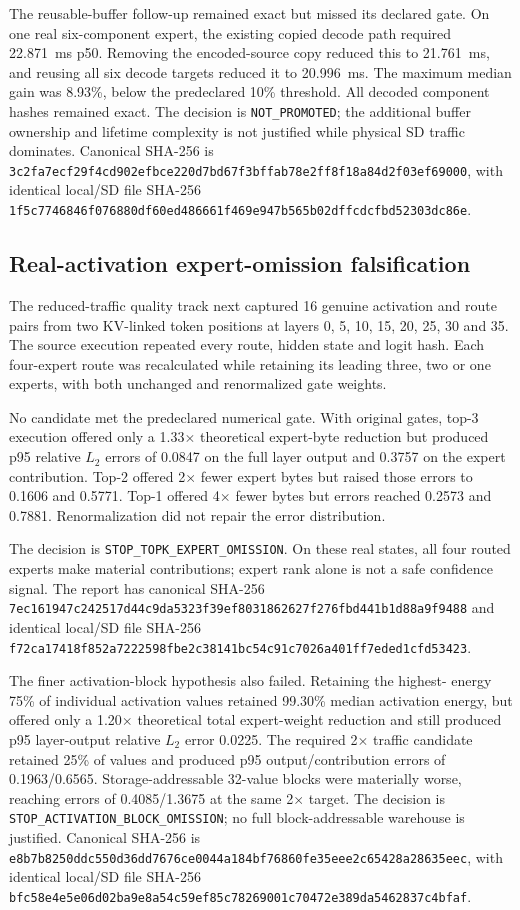 The reusable-buffer follow-up remained exact but missed its declared gate.  On
one real six-component expert, the existing copied decode path required
22.871~ms p50.  Removing the encoded-source copy reduced this to 21.761~ms,
and reusing all six decode targets reduced it to 20.996~ms.  The maximum median
gain was 8.93\%, below the predeclared 10\% threshold.  All decoded component
hashes remained exact.  The decision is \texttt{NOT\_PROMOTED}; the additional
buffer ownership and lifetime complexity is not justified while physical SD
traffic dominates.  Canonical SHA-256 is
\texttt{3c2fa7ecf29f4cd902efbce220d7bd67f3bffab78e2ff8f18a84d2f03ef69000},
with identical local/SD file SHA-256
\texttt{1f5c7746846f076880df60ed486661f469e947b565b02dffcdcfbd52303dc86e}.

\subsection{Real-activation expert-omission falsification}

The reduced-traffic quality track next captured 16 genuine activation and
route pairs from two KV-linked token positions at layers 0, 5, 10, 15, 20, 25,
30 and 35.  The source execution repeated every route, hidden state and logit
hash.  Each four-expert route was recalculated while retaining its leading
three, two or one experts, with both unchanged and renormalized gate weights.

No candidate met the predeclared numerical gate.  With original gates, top-3
execution offered only a 1.33$\times$ theoretical expert-byte reduction but
produced p95 relative $L_2$ errors of 0.0847 on the full layer output and
0.3757 on the expert contribution.  Top-2 offered 2$\times$ fewer expert bytes
but raised those errors to 0.1606 and 0.5771.  Top-1 offered 4$\times$ fewer
bytes but errors reached 0.2573 and 0.7881.  Renormalization did not repair the
error distribution.

The decision is \texttt{STOP\_TOPK\_EXPERT\_OMISSION}.  On these real states,
all four routed experts make material contributions; expert rank alone is not
a safe confidence signal.  The report has canonical SHA-256
\texttt{7ec161947c242517d44c9da5323f39ef8031862627f276fbd441b1d88a9f9488}
and identical local/SD file SHA-256
\texttt{f72ca17418f852a7222598fbe2c38141bc54c91c7026a401ff7eded1cfd53423}.

The finer activation-block hypothesis also failed.  Retaining the highest-
energy 75\% of individual activation values retained 99.30\% median activation
energy, but offered only a 1.20$\times$ theoretical total expert-weight
reduction and still produced p95 layer-output relative $L_2$ error 0.0225.
The required 2$\times$ traffic candidate retained 25\% of values and produced
p95 output/contribution errors of 0.1963/0.6565.  Storage-addressable 32-value
blocks were materially worse, reaching errors of 0.4085/1.3675 at the same
2$\times$ target.  The decision is
\texttt{STOP\_ACTIVATION\_BLOCK\_OMISSION}; no full block-addressable warehouse
is justified.  Canonical SHA-256 is
\texttt{e8b7b8250ddc550d36dd7676ce0044a184bf76860fe35eee2c65428a28635eec},
with identical local/SD file SHA-256
\texttt{bfc58e4e5e06d02ba9e8a54c59ef85c78269001c70472e389da5462837c4bfaf}.

